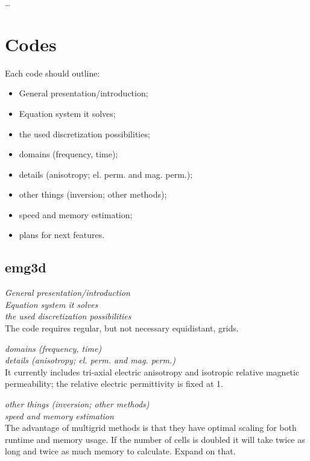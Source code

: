 \documentclass[paper,twocolumn,twoside]{geophysics}
\begin{document}
\dots

\section{Codes}

Each code should outline:
\begin{itemize}
  \item General presentation/introduction;
  \item Equation system it solves;
  \item the used discretization possibilities;
  \item domains (frequency, time);
  \item details (anisotropy; el. perm. and mag. perm.);
  \item other things (inversion; other methods);
  \item speed and memory estimation;
  \item plans for next features.
\end{itemize}

\subsection{emg3d}

\emph{General presentation/introduction}\\

\emph{Equation system it solves}\\

\emph{the used discretization possibilities}\\
The code requires regular, but not necessary equidistant, grids.

\emph{domains (frequency, time)}\\

\emph{details (anisotropy; el. perm. and mag. perm.)}\\
It currently includes tri-axial electric anisotropy and isotropic relative
magnetic permeability; the relative electric permittivity is fixed at 1.

\emph{other things (inversion; other methods)}\\

\emph{speed and memory estimation}\\
The advantage of multigrid methods is that they have optimal scaling for both
runtime and memory usage. If the number of cells is doubled it will take twice
as long and twice as much memory to calculate. Expand on that.
\end{document}

